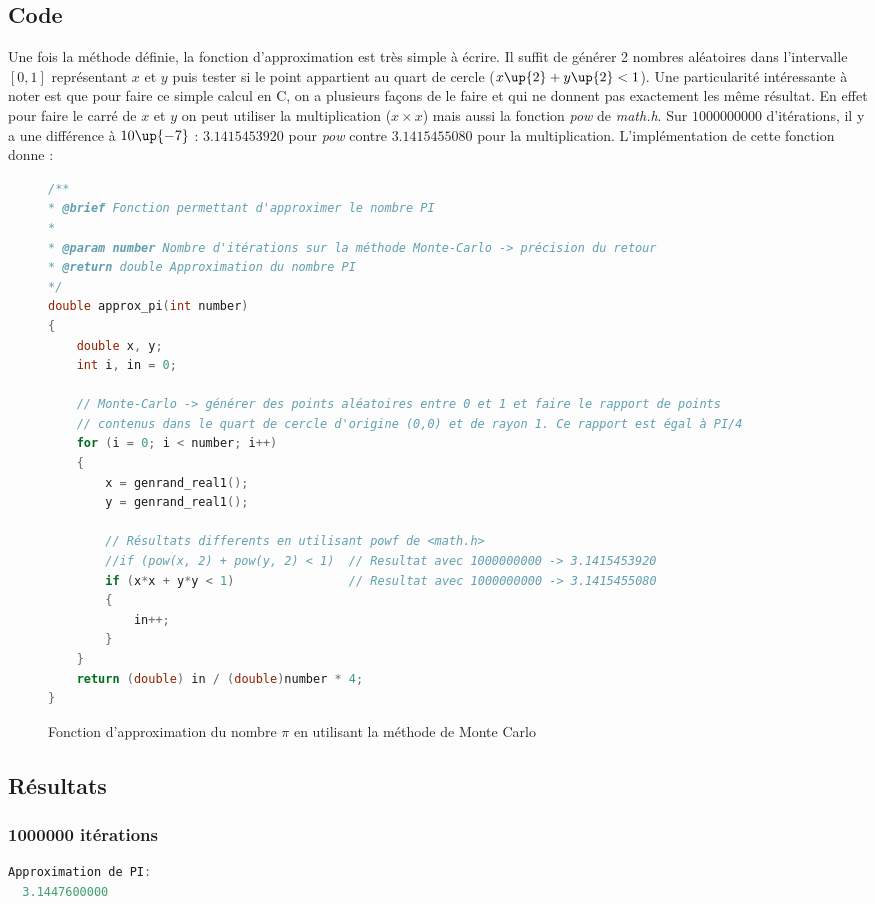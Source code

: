 \documentclass{article}
\begin{document}
\subsection{Code}
Une fois la méthode définie, la fonction d'approximation est très simple
à écrire. Il suffit de générer 2 nombres aléatoires dans l'intervalle $[0,1]$ représentant $x$ et $y$
puis tester si le point appartient au quart de cercle ($x\up{2} + y\up{2} < 1$).
Une particularité intéressante à noter est que pour faire ce simple calcul en C, on a plusieurs façons
de le faire et qui ne donnent pas exactement les même résultat. En effet pour faire le carré de $x$ et $y$
on peut utiliser la multiplication ($x \times x$) mais aussi la fonction \emph{pow} de \emph{math.h}.
Sur $1000000000$ d'itérations, il y a une différence à $10\up{-7}$ : $3.1415453920$ pour \emph{pow} contre
$3.1415455080$ pour la multiplication.
L'implémentation de cette fonction donne :

\begin{figure}[!ht]
\caption{Fonction d'approximation du nombre $\pi$ en utilisant la méthode de Monte Carlo}
\begin{lstlisting}[language=c++]
/**
* @brief Fonction permettant d'approximer le nombre PI
* 
* @param number Nombre d'itérations sur la méthode Monte-Carlo -> précision du retour
* @return double Approximation du nombre PI
*/
double approx_pi(int number)
{
    double x, y;
    int i, in = 0;

    // Monte-Carlo -> générer des points aléatoires entre 0 et 1 et faire le rapport de points
    // contenus dans le quart de cercle d'origine (0,0) et de rayon 1. Ce rapport est égal à PI/4
    for (i = 0; i < number; i++)
    {
        x = genrand_real1();
        y = genrand_real1();

        // Résultats differents en utilisant powf de <math.h>
        //if (pow(x, 2) + pow(y, 2) < 1)  // Resultat avec 1000000000 -> 3.1415453920
        if (x*x + y*y < 1)                // Resultat avec 1000000000 -> 3.1415455080
        {
            in++;
        }
    }
    return (double) in / (double)number * 4;
}
\end{lstlisting}
\end{figure}

\subsection{Résultats}

\subsubsection{1000000 itérations}
\begin{lstlisting}[language=c++]
  Approximation de PI:
  3.1447600000
\end{lstlisting}
\end{document}
